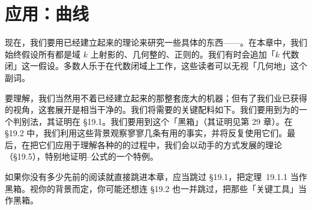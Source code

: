 
\chapter{应用：曲线}
\label{ch:curves}

现在，我们要用已经建立起来的理论来研究一些具体的东西——\trCurve。在本章中，我们始终假设所有\trCurve{}都是域 $k$ 上射影的、几何整的、正则的\trCurve。我们有时会追加「$k$ 代数闭」这一假设。多数人乐于在代数闭域上工作，这些读者可以无视「几何地」这个副词。

要理解\trCurve，我们当然用不着已经建立起来的那整套庞大的机器；但有了我们业已获得的视角，这套展开是相当干净的。我们将需要的关键配料如下。我们要用到\trMorphism{}为\trClosedEmbedding{}的一个判别法，其证明在 \S19.1。我们要用到\trSerreDuality{}这个「黑箱」（其证明见第 29 章）。在 \S19.2 中，我们利用这些背景观察寥寥几条有用的事实，并将反复使用它们。最后，在把它们应用于理解各种\trGenus{}的\trCurve{}的过程中，我们会以动手的方式发展\trHyperelliptic\trCurve{}的理论（\S19.5），特别地证明\trRiemann--\trHurwitz{}公式的一个特例。

如果你没有多少先前的阅读就直接跳进本章，应当跳过 \S19.1，把\mbox{定理~19.1.1} 当作黑箱。视你的背景而定，你可能还想连 \S19.2 也一并跳过，把那些「关键工具」当作黑箱。












